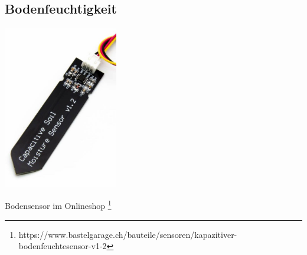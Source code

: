 \documentclass[
  12pt, %
  a4paper, %
  twoside, %
  openright, %
  numbers=noenddot, %
  BCOR=5mm, %
  parskip=half*, %
  thesis, %
]{bfhbook}
\begin{document}
\subsection{Bodenfeuchtigkeit}

\begin{center}
\includegraphics[width=5cm, left]{Bilder/Soil-2.jpg}%
\label{labelname}%
\end{center}
Bodensensor im Onlineshop \footnote{https://www.bastelgarage.ch/bauteile/sensoren/kapazitiver-bodenfeuchtesensor-v1-2}
\end{document}
